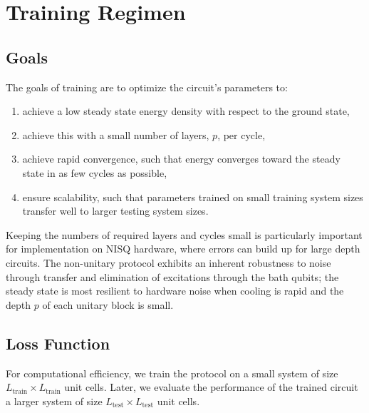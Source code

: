 \documentclass[twocolumn,
aps,
prx,
showpacs,
amsmath,
amssymb,
floatfix,
longbibliography,
superscriptaddress,
eprint]
{revtex4-1}
\begin{document}
\section{Training Regimen}

\subsection{Goals}

The goals of training are to optimize the circuit's parameters to:
\begin{enumerate}
\item[(i)] achieve a low steady state energy density with respect to the ground state,
\item[(ii)] achieve this with a small number of layers, $p$, per cycle,
\item[(iii)] achieve rapid convergence, such that energy converges toward the steady state in as few cycles as possible,
\item[(iv)] ensure scalability, such that parameters trained on small training system sizes transfer well to larger testing system sizes.
\end{enumerate}

Keeping the numbers of required layers and cycles small is particularly important for implementation on NISQ hardware, where errors can build up for large depth circuits. The non-unitary protocol exhibits an inherent robustness to noise through transfer and elimination of excitations through the bath qubits; the steady state is most resilient to hardware noise when cooling is rapid and the depth $p$ of each unitary block is small.

\subsection{Loss Function}

For computational efficiency, we train the protocol on a small system of size $L_{\text{train}} \times L_{\text{train}}$ unit cells. Later, we evaluate the performance of the trained circuit a larger system of size $L_{\text{test}} \times L_{\text{test}}$ unit cells.
\end{document}
